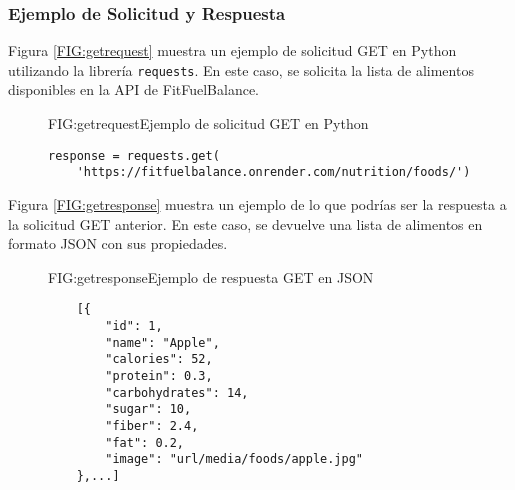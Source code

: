 \subsubsection{Ejemplo de Solicitud y Respuesta}
Figura \ref{FIG:getrequest} muestra un ejemplo de solicitud GET en Python utilizando la librería \texttt{requests}. En este caso, se solicita la lista de alimentos disponibles en la API de FitFuelBalance.
\begin{figure}[Ejemplo Solicitud GET]{FIG:getrequest}{Ejemplo de solicitud GET en Python}
\begin{verbatim}
response = requests.get(
    'https://fitfuelbalance.onrender.com/nutrition/foods/')
\end{verbatim}
\end{figure}

Figura \ref{FIG:getresponse} muestra un ejemplo de lo que podrías ser la respuesta a la solicitud GET anterior. En este caso, se devuelve una lista de alimentos en formato JSON con sus propiedades.

\begin{figure}[Ejemplo Respuesta GET]{FIG:getresponse}{Ejemplo de respuesta GET en JSON}
\begin{verbatim}
    [{
        "id": 1,
        "name": "Apple",
        "calories": 52,
        "protein": 0.3,
        "carbohydrates": 14,
        "sugar": 10,
        "fiber": 2.4,
        "fat": 0.2,
        "image": "url/media/foods/apple.jpg"
    },...]
\end{verbatim}
\end{figure}